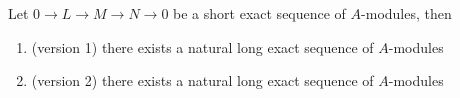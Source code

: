 \begin{lemma}
	\label{lemma7}
	Let $0 \to L \to M \to N \to 0$ be a short exact sequence of $A$-modules, then 
	\begin{enumerate}
		\item (version 1) there exists a natural long exact sequence of $A$-modules
		\begin{center}
		\end{center}
		\item (version 2) there exists a natural long exact sequence of $A$-modules
		\begin{center}
		\end{center}
	\end{enumerate}
\end{lemma}
 
